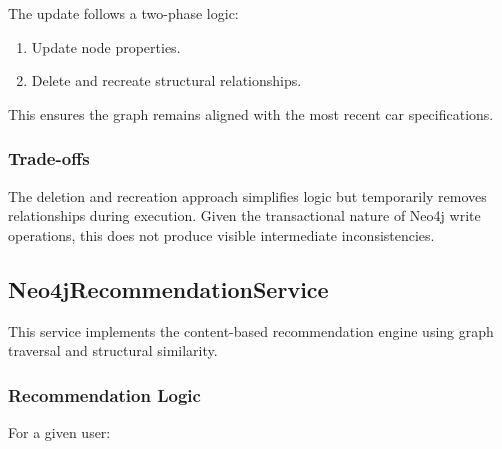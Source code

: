 The update follows a two-phase logic:

\begin{enumerate}
    \item Update node properties.
    \item Delete and recreate structural relationships.
\end{enumerate}

This ensures the graph remains aligned with the most recent
car specifications.

\subsubsection*{Trade-offs}

The deletion and recreation approach simplifies logic but
temporarily removes relationships during execution.
Given the transactional nature of Neo4j write operations,
this does not produce visible intermediate inconsistencies.

\subsection{Neo4jRecommendationService}

This service implements the content-based recommendation engine
using graph traversal and structural similarity.

\subsubsection*{Recommendation Logic}

For a given user:

